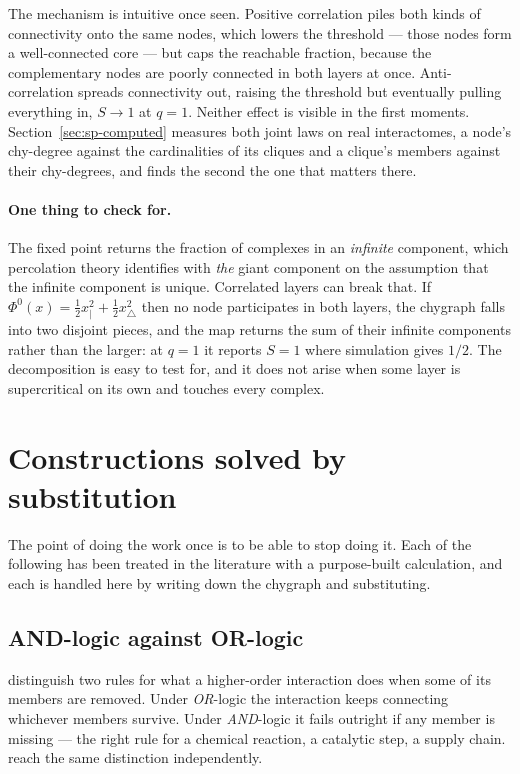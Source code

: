 The mechanism is intuitive once seen. Positive correlation piles both kinds of
connectivity onto the same nodes, which lowers the threshold --- those nodes
form a well-connected core --- but caps the reachable fraction, because the
complementary nodes are poorly connected in both layers at once.
Anti-correlation spreads connectivity out, raising the threshold but eventually
pulling everything in, $S\to1$ at $q=1$. Neither effect is visible in the first
moments. Section~\ref{sec:sp-computed} measures both joint laws on real
interactomes, a node's chy-degree against the cardinalities of its
cliques and a clique's members against their chy-degrees, and finds the
second the one that matters there.

\paragraph{One thing to check for.} The fixed point returns the fraction of
complexes in an \emph{infinite} component, which percolation theory identifies
with \emph{the} giant component on the assumption that the infinite component is
unique. Correlated layers can break that. If
$\Phi^{0}(x)=\tfrac12x_{|}^{2}+\tfrac12x_{\triangle}^{2}$ then no node
participates in both layers, the chygraph falls into two disjoint pieces, and
the map returns the sum of their infinite components rather than the larger: at
$q=1$ it reports $S=1$ where simulation gives $1/2$. The decomposition is easy
to test for, and it does not arise when some layer is supercritical on its own
and touches every complex.

\section{Constructions solved by substitution}
\label{sec:constructions}

The point of doing the work once is to be able to stop doing it. Each of the
following has been treated in the literature with a purpose-built calculation,
and each is handled here by writing down the chygraph and substituting.

\subsection{AND-logic against OR-logic}
\label{sec:andor}

\citet{bianconi2024} distinguish two rules for what a
higher-order interaction does when some of its members are removed. Under
\emph{OR}-logic the interaction keeps connecting whichever members survive.
Under \emph{AND}-logic it fails outright if any member is missing --- the right
rule for a chemical reaction, a catalytic step, a supply chain.
\citet{ha2025} reach the same distinction independently.

